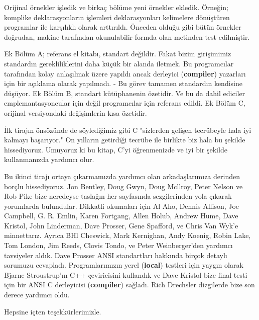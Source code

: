 \documentclass[a4paper,12pt,oneside]{book}
\begin{document}
\thispagestyle{preface} \noindent Orijinal örnekler işledik ve birkaç bölüme yeni örnekler ekledik. Örneğin; komplike deklarasyonların işlemleri deklarasyonları kelimelere dönüştüren programlar ile karşılıklı olarak arttırıldı. Önceden olduğu gibi bütün örnekler doğrudan, makine tarafından okunulabilir formda olan metinden test edilmiştir.  \par Ek Bölüm A; referans el kitabı, standart değildir. Fakat bizim girişimimiz standardın gerekliliklerini daha küçük bir alanda iletmek. Bu programcılar tarafından kolay anlaşılmak üzere yapıldı ancak derleyici (\textbf{compiler}) yazarları için bir açıklama olarak yapılmadı. - Bu görev tamamen standardın kendisine düşüyor. Ek Bölüm B, standart kütüphanenin özetidir. Ve bu da dahil ediciler emplemantasyoncular için değil programcılar için referans edildi. Ek Bölüm C, orijinal versiyondaki değişimlerin kısa özetidir.  \par İlk tirajın önsözünde de söylediğimiz gibi C "sizlerden gelişen tecrübeyle hala iyi kalmayı başarıyor." On yılların getirdiği tecrübe ile birlikte biz hala bu şekilde hissediyoruz. Umuyoruz ki bu kitap, C'yi öğrenmenizde ve iyi bir şekilde kullanmanızda yardımcı olur.
\par Bu ikinci tirajı ortaya çıkarmamızda yardımcı olan arkadaşlarımıza derinden borçlu hissediyoruz.  Jon Bentley, Doug Gwyn, Doug Mcllroy, Peter Nelson ve Rob Pike bize neredeyse taslağın her sayfasında sezgilerinden yola çıkarak yorumlarda bulundular. Dikkatli okumaları için  Al Aho, Dennis Allison, Joe Campbell, G. R. Emlin, Karen Fortgang, Allen Holub, Andrew Hume, Dave Kristol, John Linderman, Dave Prosser, Gene Spafford, ve Chris Van Wyk'e minnettarız. Ayrıca  BHl Cheswick, Mark Kernighan, Andy Koenig, Robin Lake, Tom London, Jim Reeds, Clovis Tondo, ve Peter Weinberger'den yardımcı tavsiyeler aldık. Dave Prosser ANSI standartları hakkında birçok detaylı sorumuzu cevapladı. Programlarımızın yerel (\textbf{local}) testleri için yaygın olarak  Bjarne Stroustrup'ın C++ çeviricisini kullandık ve Dave Kristol bize final testi için bir ANSI C derleyicisi (\textbf{compiler}) sağladı. Rich Drechsler dizgilerde bize son derece yardımcı oldu.
\par Hepsine içten teşekkürlerimizle.
\newline

\noindent \hspace*{270pt}{Brian W. Kernighan \\}
\hspace*{280pt}{Dennis M. Ritchie}
\end{document}

